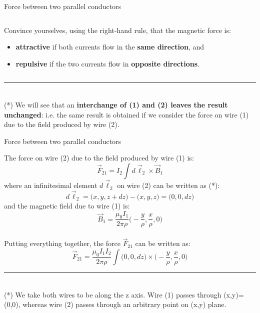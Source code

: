\begin{frame}{Force between two parallel conductors}
\begin{columns}
\begin{column}{0.60\textwidth}
\begin{itemize}
     \end{itemize}
     \vspace{0.1cm}
     Convince yourselves, using the right-hand rule, that the magnetic force is:
     \begin{itemize}
         \item {\bf attractive} if both currents flow in the {\bf same direction}, and
         \item {\bf repulsive} if the two currents flow in {\bf opposite directions}.\\
     \end{itemize}
  \end{column}
\end{columns}
\vspace{0.1cm}
\noindent\rule{2cm}{0.4pt}\\
{\scriptsize
 (*)
     We will see that an {\bf interchange of (1) and (2) leaves the result unchanged}:
     i.e. the same result is obtained if we consider
     the force on wire (1) due to the field produced by wire (2).\\
}
\end{frame}

%
%
%

\begin{frame}{Force between two parallel conductors}

The force on wire (2) due to the field produced by wire (1) is:
\begin{equation*}
  \vec{F}_{21} = I_{2} \int d\vec{\ell}_{2} \times \vec{B}_{1}
\end{equation*}
where an infinitesimal element $d\vec{\ell}_{2}$ on wire (2) can be written as (*):
\begin{equation*}
  d\vec{\ell}_{2} = \Big( x, y, z+dz \Big) - \Big( x, y, z \Big) = \Big( 0, 0, dz \Big)
\end{equation*}
and the magnetic field due to wire (1) is:
\begin{equation*}
  \vec{B}_{1} = \frac{\mu_0I_{1}}{2\pi \rho} \Big( -\frac{y}{\rho}, \frac{x}{\rho}, 0 \Big)
\end{equation*}\\
\vspace{0.1cm}
Putting everything together,
the force $\vec{F}_{21}$ can be written as:
\begin{equation*}
  \vec{F}_{21} = \frac{\mu_0 I_{1} I_{2}}{2\pi \rho} \int \Big( 0, 0, dz \Big) \times \Big( -\frac{y}{\rho}, \frac{x}{\rho}, 0 \Big)
\end{equation*}

\noindent\rule{2cm}{0.4pt}\\
{\scriptsize
 (*) We take both wires to be along the z axis.
     Wire (1) passes through (x,y)=(0,0), whereas wire (2) passes through an arbitrary point on (x,y) plane.
}

\end{frame}

